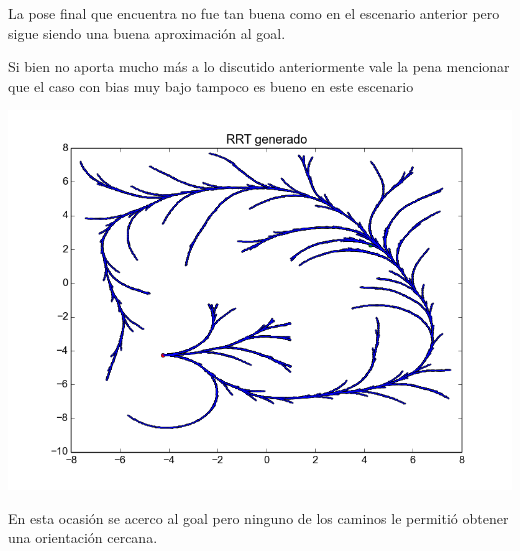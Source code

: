 La pose final que encuentra no fue tan buena como en el escenario anterior pero sigue siendo una buena aproximación al goal.

Si bien no aporta mucho más a lo discutido anteriormente vale la pena mencionar que el caso con bias muy bajo tampoco es bueno en este escenario

\includegraphics[scale=0.5]{tp4_imagenes/informe_goal_bias_dificl_01.png}

En esta ocasión se acerco al goal pero ninguno de los caminos le permitió obtener una orientación cercana.


